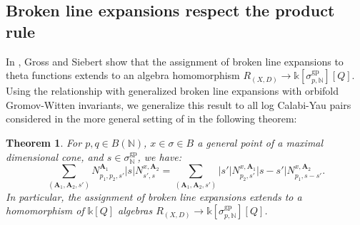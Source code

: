 \documentclass[12pt, oneside]{amsart}   	%
\newcounter{thm}
\newtheorem{theorem}[thm]{Theorem}
\newtheorem{corollary}[thm]{Corollary}
\newcommand{\NN}{\mathbb{N}}
\newcommand{\kk}{\mathds{k}}
\newcommand{\gp}{\operatorname{gp}}
\numberwithin{equation}{section}
\numberwithin{thm}{section}
\numberwithin{figure}{section}
\begin{document}
 
% 
 
 
 \subsection{Broken line expansions respect the product rule}
 
In \cite[Theorem $6.1$]{scatt}, Gross and Siebert show that the assignment of broken line expansions to theta functions extends to an algebra homomorphism $R_{(X,D)} \rightarrow \kk[\sigma_{p,\NN}^{\gp}][Q]$. Using the relationship with generalized broken line expansions with orbifold Gromov-Witten invariants, we generalize this result to all log Calabi-Yau pairs considered in the more general setting of \cite{int_mirror} in the following theorem:
 
 
 
 
 \begin{theorem}\label{blhom}
For $p,q \in B(\NN)$, $x \in \sigma \in B$ a general point of a maximal dimensional cone, and $s \in \sigma_{\NN}^{\gp}$, we have:
 \begin{equation}\label{blWDVV}
 \sum_{(\textbf{A}_1, \textbf{A}_2,s')} N_{p_1,p_2,s'}^{\textbf{A}_1}|s|N_{s',s}^{x,\textbf{A}_2} = \sum_{(\textbf{A}_1, \textbf{A}_2 ,s')} |s'|N_{p_2,s'}^{x,\textbf{A}_1}|s-s'|N_{p_1,s-s'}^{x,\textbf{A}_2}.
 \end{equation}
 In particular, the assignment of broken line expansions extends to a homomorphism of $\kk[Q]$ algebras $R_{(X,D)} \rightarrow \kk[\sigma_{p,\NN}^{\gp}][Q]$.
 \end{theorem}
 
\end{document}

